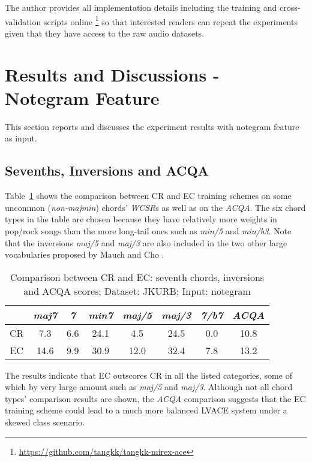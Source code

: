 The author provides all implementation details including the training and cross-validation scripts online \footnote{\url{https://github.com/tangkk/tangkk-mirex-ace}} so that interested readers can repeat the experiments given that they have access to the raw audio datasets.

\section{Results and Discussions - Notegram Feature} \label{sec:4-ng}
This section reports and discusses the experiment results with notegram feature as input.
\subsection{Sevenths, Inversions and ACQA}

Table~\ref{tab:4-acqa} shows the comparison between CR and EC training schemes on some uncommon (\textit{non-majmin}) \cite{burgoyne2011expert} chords' \textit{WCSR}s as well as on the \textit{ACQA}. The six chord types in the table are chosen because they have relatively more weights in pop/rock songs than the more long-tail ones such as \textit{min/5} and \textit{min/b3}. Note that the inversions \textit{maj/5} and \textit{maj/3} are also included in the two other large vocabularies proposed by Mauch \cite{mauch2010automatic} and Cho \cite{cho2014improved}.
\begin{table}[htb]
	\caption{Comparison between CR and EC: seventh chords, inversions and ACQA scores; Dataset: JKURB; Input: notegram}
	\centering
	\footnotesize
	\begin{tabular}{|c|c|c|c|c|c|c|c|} \hline
		& \textit{maj7} & \textit{7} & \textit{min7} & \textit{maj/5} & \textit{maj/3} & \textit{7/b7} & \textit{ACQA} \\ \hline
		CR & 7.3 & 6.6 & 24.1 & 4.5 & 24.5 & 0.0 & 10.8 \\ \hline
		EC &  14.6 & 9.9 & 30.9 & 12.0 & 32.4 & 7.8 & 13.2 \\ \hline
	\end{tabular}
	\label{tab:4-acqa}
\end{table}

The results indicate that EC outscores CR in all the listed categories, some of which by very large amount such as \textit{maj/5} and \textit{maj/3}. Although not all chord types' comparison results are shown, the \textit{ACQA} comparison suggests that the EC training scheme could lead to a much more balanced LVACE system under a skewed class scenario.

